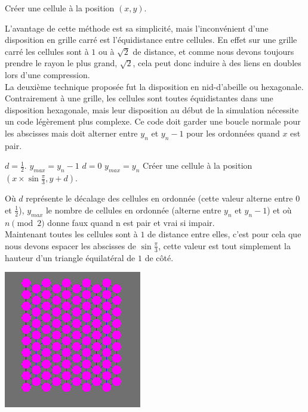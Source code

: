 \documentclass[a4paper,11pt]{article}
\begin{document}
\medbreak
\begin{algorithmic}[1]
	\STATE Créer une cellule à la position $(x, y)$.
      \ENDFOR
    \ENDFOR
\end{algorithmic}
\medbreak

L'avantage de cette méthode est sa simplicité, mais l'inconvénient d'une disposition en grille carré est l'équidistance entre cellules. En effet sur une grille carré les cellules sont à $1$ ou à $\sqrt{2}$ de distance, et comme nous devons toujours prendre le rayon le plus grand, $\sqrt{2}$, cela peut donc induire à des liens en doubles lors d'une compression.\\
La deuxième technique proposée fut la disposition en nid-d'abeille ou hexagonale.
Contrairement à une grille, les cellules sont toutes équidistantes dans une disposition hexagonale, mais leur disposition au début de la simulation nécessite un code légèrement plus complexe.
Ce code doit garder une boucle normale pour les abscisses mais doit alterner entre $y_n$ et $y_n - 1$ pour les ordonnées quand $x$ est pair.

\medbreak
\begin{algorithmic}[1]
	\STATE $d = \frac{1}{2}$.
	\STATE $y_{max} = y_n - 1$
      \ELSE
	\STATE $d = 0$
	\STATE $y_{max} = y_n$
      \ENDIF
	\STATE Créer une cellule à la position $\displaystyle{(x \times \sin \frac{\pi}{3}, y + d)}$.
      \ENDFOR
   \ENDFOR
\end{algorithmic}
\medbreak
Où $d$ représente le décalage des cellules en ordonnée (cette valeur alterne entre $0$ et $\frac{1}{2}$), $y_{max}$ le nombre de cellules en ordonnée (alterne entre $y_n$ et $y_n - 1$) et où $n \pmod 2$ donne faux quand n est pair et vrai si impair. \\
Maintenant toutes les cellules sont à $1$ de distance entre elles, c'est pour cela que nous devons espacer les abscisses de $\displaystyle{\sin \frac{\pi}{3}}$, cette valeur est tout simplement la hauteur d'un triangle équilatéral de $1$ de côté.

\begin{center}
  \includegraphics[width=6cm]{Images/hexagone.png}
\end{center}
\end{document}

